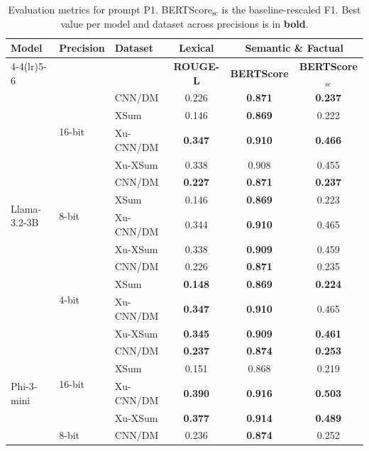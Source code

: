 \begin{table}[tbp]
\centering
\footnotesize
\setlength{\tabcolsep}{4pt}
\caption{Evaluation metrics for prompt P1. BERTScore$_{\mathrm{sc}}$ is the baseline-rescaled F1. Best value per model and dataset across precisions is in \textbf{bold}.}
\label{tab:eval-P1}
\begin{tabular}{lllccc}
\toprule
\multirow{2}{*}{\textbf{Model}} & \multirow{2}{*}{\textbf{Precision}} & \multirow{2}{*}{\textbf{Dataset}} & \textbf{Lexical} & \multicolumn{2}{c}{\textbf{Semantic \& Factual}} \\
\cmidrule(lr){4-4}\cmidrule(lr){5-6}
 & & & \textbf{ROUGE-L} & \textbf{BERTScore} & \textbf{BERTScore$_{\mathrm{sc}}$} \\
\midrule
\multirow{12}{*}{Llama-3.2-3B} & \multirow{4}{*}{16-bit} & CNN/DM & 0.226 & \textbf{0.871} & \textbf{0.237} \\
 &  & XSum & 0.146 & \textbf{0.869} & 0.222 \\
 &  & Xu-CNN/DM & \textbf{0.347} & \textbf{0.910} & \textbf{0.466} \\
 &  & Xu-XSum & 0.338 & 0.908 & 0.455 \\
\cmidrule(lr){2-6}
 & \multirow{4}{*}{8-bit} & CNN/DM & \textbf{0.227} & \textbf{0.871} & \textbf{0.237} \\
 &  & XSum & 0.146 & \textbf{0.869} & 0.223 \\
 &  & Xu-CNN/DM & 0.344 & \textbf{0.910} & 0.465 \\
 &  & Xu-XSum & 0.338 & \textbf{0.909} & 0.459 \\
\cmidrule(lr){2-6}
 & \multirow{4}{*}{4-bit} & CNN/DM & 0.226 & \textbf{0.871} & 0.235 \\
 &  & XSum & \textbf{0.148} & \textbf{0.869} & \textbf{0.224} \\
 &  & Xu-CNN/DM & \textbf{0.347} & \textbf{0.910} & 0.465 \\
 &  & Xu-XSum & \textbf{0.345} & \textbf{0.909} & \textbf{0.461} \\
\midrule
\multirow{12}{*}{Phi-3-mini} & \multirow{4}{*}{16-bit} & CNN/DM & \textbf{0.237} & \textbf{0.874} & \textbf{0.253} \\
 &  & XSum & 0.151 & 0.868 & 0.219 \\
 &  & Xu-CNN/DM & \textbf{0.390} & \textbf{0.916} & \textbf{0.503} \\
 &  & Xu-XSum & \textbf{0.377} & \textbf{0.914} & \textbf{0.489} \\
\cmidrule(lr){2-6}
 & \multirow{4}{*}{8-bit} & CNN/DM & 0.236 & \textbf{0.874} & 0.252 \\

\end{tabular}
\end{table}
